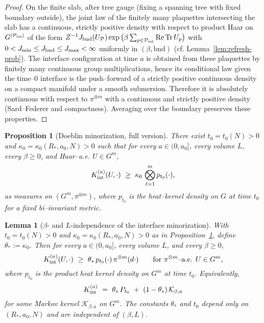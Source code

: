 \documentclass[11pt]{amsart}
\theoremstyle{plain}
\newtheorem{lemma}[theorem]{Lemma}
\newtheorem{proposition}[theorem]{Proposition}
\theoremstyle{definition}
\theoremstyle{remark}
\begin{document}
\begin{proof}
On the finite slab, after tree gauge (fixing a spanning tree with fixed boundary outside), the joint law of the finitely many plaquettes intersecting the slab has a continuous, strictly positive density with respect to product Haar on $G^{|\mathcal P_{\rm int}|}$ of the form $Z^{-1} J_{\rm bnd}(U_{\mathcal P})\exp\big(\beta \sum_{p\in\mathcal P_{\rm int}} \mathrm{Re\,Tr}\,U_p\big)$ with $0<J_{\min}\le J_{\rm bnd}\le J_{\max}<\infty$ uniformly in $(\beta,\text{bnd})$ (cf. Lemma~\ref{lem:refresh-prob}). The interface configuration at time $a$ is obtained from these plaquettes by finitely many continuous group multiplications, hence its conditional law given the time–$0$ interface is the push–forward of a strictly positive continuous density on a compact manifold under a smooth submersion. Therefore it is absolutely continuous with respect to $\pi^{\otimes m}$ with a continuous and strictly positive density (Sard–Federer and compactness). Averaging over the boundary preserves these properties.
\end{proof}

\begin{proposition}[Doeblin minorization, full version]\label{prop:doeblin-full}
There exist $t_0=t_0(N)>0$ and $\kappa_0=\kappa_0(R_*,a_0,N)>0$ such that for every $a\in(0,a_0]$, every volume $L$, every $\beta\ge 0$, and Haar–a.e. $U\in G^m$,
\[
  K_{\rm int}^{(a)}(U,\cdot)\ \ge\ \kappa_0\, \bigotimes_{\ell=1}^m p_{t_0}(\cdot),
\]
as measures on $(G^m,\pi^{\otimes m})$, where $p_{t_0}$ is the heat–kernel density on $G$ at time $t_0$ for a fixed bi–invariant metric.
\end{proposition}

\begin{lemma}[\boldmath$\beta$- and $L$-independence of the interface minorization]\label{lem:beta-L-independent-minorization}
With $t_0=t_0(N)>0$ and $\kappa_0=\kappa_0(R_*,a_0,N)>0$ as in Proposition~\ref{prop:doeblin-full}, define $\theta_*:=\kappa_0$. Then for every $a\in(0,a_0]$, every volume $L$, and every $\beta\ge 0$,
\[
  K_{\rm int}^{(a)}(U,\cdot)\ \ge\ \theta_*\, p_{t_0}(\cdot)\,\pi^{\otimes m}(d\cdot)\qquad\text{for $\pi^{\otimes m}$–a.e. $U\in G^m$,}
\]
where $p_{t_0}$ is the product heat kernel density on $G^m$ at time $t_0$. Equivalently,
\[
  K_{\rm int}^{(a)}\ =\ \theta_*\,P_{t_0}\ +\ (1-\theta_*)\,\mathcal K_{\beta,a}
\]
for some Markov kernel $\mathcal K_{\beta,a}$ on $G^m$. The constants $\theta_*$ and $t_0$ depend only on $(R_*,a_0,N)$ and are independent of $(\beta,L)$.
\end{lemma}
\end{document}
